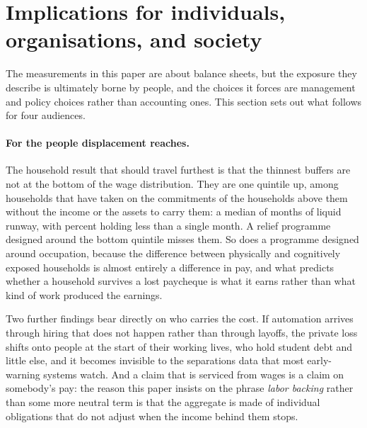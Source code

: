 \section{Implications for individuals, organisations, and society}
\label{sec:implications}

The measurements in this paper are about balance sheets, but the exposure they describe is
ultimately borne by people, and the choices it forces are management and policy choices rather
than accounting ones. This section sets out what follows for four audiences.

\paragraph{For the people displacement reaches.} The household result that should travel furthest
is that the thinnest buffers are not at the bottom of the wage distribution. They are one quintile
up, among households that have taken on the commitments of the households above them without the
income or the assets to carry them: a median of  months of liquid runway, with
 percent holding less than a single month. A relief programme designed around
the bottom quintile misses them. So does a programme designed around occupation, because the
difference between physically and cognitively exposed households is almost entirely a difference
in pay, and what predicts whether a household survives a lost paycheque is what it earns rather
than what kind of work produced the earnings.

Two further findings bear directly on who carries the cost. If automation arrives through hiring
that does not happen rather than through layoffs, the private loss shifts onto people at the start
of their working lives, who hold student debt and little else, and it becomes invisible to the
separations data that most early-warning systems watch. And a claim that is serviced from wages is
a claim on somebody's pay: the reason this paper insists on the phrase \emph{labor backing} rather
than some more neutral term is that the aggregate is made of individual obligations that do not
adjust when the income behind them stops.

